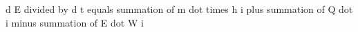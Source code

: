d E divided by d t equals summation of m dot times h i plus summation of Q dot i minus summation of E dot W i
